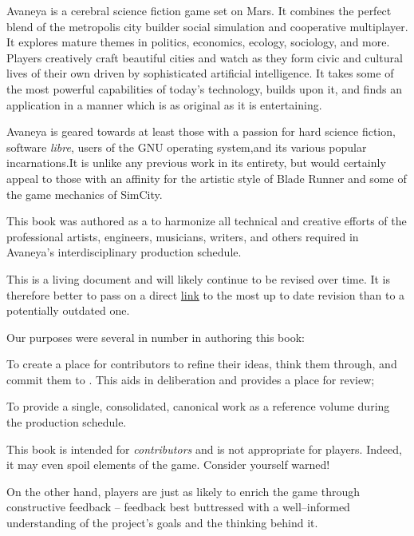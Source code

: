 

Avaneya is a cerebral science fiction game set on Mars. It combines the perfect blend of the metropolis city builder social simulation and cooperative multiplayer. It explores mature themes in politics, economics, ecology, sociology, and more. Players creatively craft beautiful cities and watch as they form civic and cultural lives of their own driven by sophisticated artificial intelligence. It takes some of the most powerful capabilities of today's technology, builds upon it, and finds an application in a manner which is as original as it is entertaining.

Avaneya is geared towards at least those with a passion for hard science fiction, software {\it libre}, users of the GNU operating system, and its various popular incarnations. It is unlike any previous work in its entirety, but would certainly appeal to those with an affinity for the artistic style of Blade Runner and some of the game mechanics of SimCity. 

This book was authored as a  to harmonize all technical and creative efforts of the professional artists, engineers, musicians, writers, and others required in Avaneya's interdisciplinary production schedule.

This is a living document and will likely continue to be revised over time. It is therefore better to pass on a direct \href{\LatestHandbookURL}{link} to the most up to date revision than to a potentially outdated one.

Our purposes were several in number in authoring this book:

\startitemize[4]
\item
To create a place for contributors to refine their ideas, think them through, and commit them to . This aids in deliberation and provides a place for review;

\item
To provide a single, consolidated, canonical work as a reference volume during the production schedule.
\stopitemize

This book is intended for {\it contributors} and is not appropriate for players. Indeed, it may even spoil elements of the game. Consider yourself warned!

On the other hand, players are just as likely to enrich the game through constructive feedback -- feedback best buttressed with a well--informed understanding of the project's goals and the thinking behind it. 

\StopChapter

